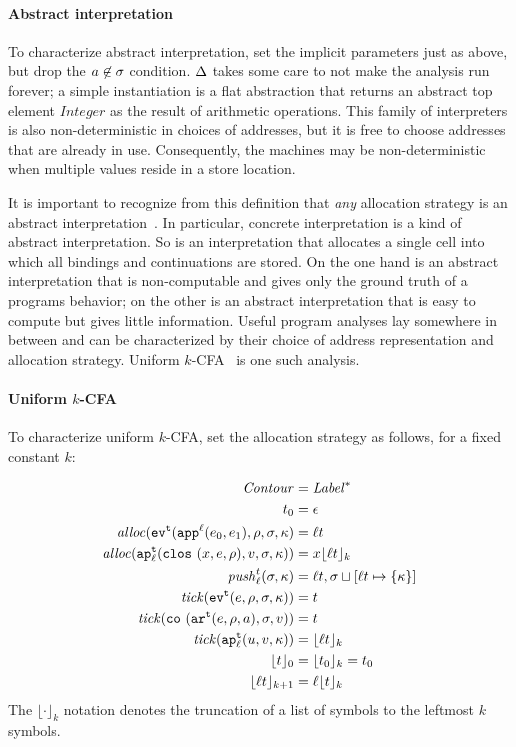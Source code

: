 \documentclass[preprint,onecolumn,9pt]{sigplanconf} %
\begin{document}
\paragraph{Abstract interpretation} To characterize abstract
interpretation, set the implicit parameters just as above, but drop
the $\maddr \not\in \msto$ condition. $\interpdelta$ takes some care
to not make the analysis run forever; a simple instantiation is a flat
abstraction that returns an abstract top element $\mathit{Integer}$ as
the result of arithmetic operations.  This family of interpreters is
also non-deterministic in choices of addresses, but it is free to
choose addresses that are already in use.  Consequently, the machines
may be non-deterministic when multiple values reside in a store
location.

It is important to recognize from this definition that \emph{any}
allocation strategy is an abstract
interpretation~\cite{dvanhorn:Might2009Posteriori}.  In particular,
concrete interpretation is a kind of abstract interpretation.  So is
an interpretation that allocates a single cell into which all bindings
and continuations are stored.  On the one hand is an abstract
interpretation that is non-computable and gives only the ground truth
of a programs behavior; on the other is an abstract interpretation
that is easy to compute but gives little information.  Useful program
analyses lay somewhere in between and can be characterized by their
choice of address representation and allocation strategy.  Uniform
\(k\)-CFA~\cite{dvanhorn:nielson-nielson-popl97} is one such analysis.

\paragraph{Uniform \(k\)-CFA} To characterize uniform \(k\)-CFA, set the allocation
strategy as follows, for a fixed constant \(k\):

\begin{align*}
\Counter &= \Label^* \\
\mtcntr &= \epsilon \\
\alloc(\ev[^\mcntr]{\sapp[^\mlab]{\mexpi0}{\mexpi1},\menv,\msto,\mkont} &= \mlab\mcntr \\
\alloc(\ap[^\mcntr_\mlab]{\clos{\mvar,\mexp,\menv},\mval,\msto,\mkont}) &= \mvar\kpush[_k]{\mlab\mcntr} \\
\push_\mlab^\mcntr(\msto,\mkont) &=
  \mlab\mcntr,\msto\sqcup[\mlab\mcntr\mapsto\{\mkont\}] \\
\tick(\ev[^\mcntr]{\mexp,\menv,\msto,\mkont}) &= \mcntr \\
\tick(\co{\kar[^\mcntr]{\mexp,\menv,\maddr},\msto,\mval}) &= \mcntr \\
\tick(\ap[^\mcntr_\mlab]{\mvalx{u},\mval,\mkont}) &= \kpush[_k]{\mlab\mcntr} \\
  \kpush[_0]{\mcntr} &= \kpush[_k]{\mtcntr} = \mtcntr \\
  \kpush[_{k+1}]{\mlab\mcntr} &= \mlab\kpush[_k]{\mcntr} \\
\end{align*}
The \(\lfloor\cdot\rfloor_k\) notation denotes the truncation of a list
of symbols to the leftmost \(k\) symbols.
\end{document}
